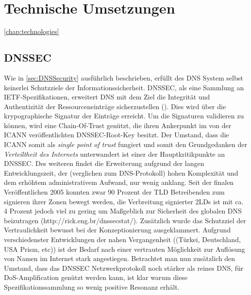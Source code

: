 \chapter{Technische Umsetzungen}
\ref{chap:technologies}

\section{DNSSEC}

Wie in \ref{sec:DNSSecurity} ausführlich beschrieben, erfüllt des DNS System selbst keinerlei Schutzziele der Informationssicherheit. DNSSEC, als eine Sammlung an IETF-Spezifikationen, erweitert DNS mit dem Ziel die Integrität und Authentizität der Ressourceneinträge sicherzustellen (\cite{Arends2005}). Dies wird über die krypographische Signatur der Einträge erreicht. Um die Signaturen validieren zu können, wird eine Chain-Of-Trust genützt, die ihren Ankerpunkt im von der ICANN veröffentlichten DNSSEC-Root-Key besitzt. Der Umstand, dass die ICANN somit als \textit{single point of trust} fungiert und somit den Grundgedanken der \textit{Verteiltheit des Internets} unterwandert ist einer der Hauptkritikpunkte an DNSSEC. Des weiteren findet die Erweiterung aufgrund der langen Entwicklungszeit, der (verglichen zum DNS-Protokoll) hohen Komplexität und dem erhöhtem administrativem Aufwand, nur wenig anklang. Seit der finalen Veröffentlichen 2005 konnten zwar 90 Prozent der TLD Betreibenden zum signieren ihrer Zonen bewegt werden, die Verbreitung signierter 2LDs ist mit ca. 4 Prozent jedoch viel zu gering um Maßgeblich zur Sicherheit des globalen DNS beizutragen (http://rick.eng.br/dnssecstat/). Zusätzlich wurde das Schutzziel der Vertraulichkeit bewusst bei der Konzeptionierung ausgeklammert. Aufgrund verschiedenster Entwicklungen der nahen Vergangenheit ((Türkei, Deutschland, USA Prism, etc)) ist der Bedarf nach einer vertrauten Möglichkeit zur Auflösung von Namen im Internet stark angestiegen. Betrachtet man nun zusätzlich den Umstand, dass das DNSSEC Netzwerkprotokoll noch stärker als reines DNS, für DoS-Amplification genützt werden kann, ist klar warum diese Spezifikationssammlung so wenig positive Resonanz erhält.


